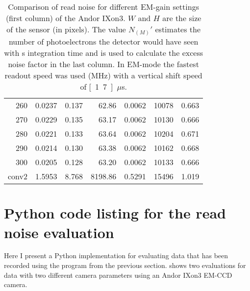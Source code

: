 \begin{table}[!htbp]
\begin{tabular}{r l l r  l r l}
260 & 0.0237 & 0.137 & 62.86 & 0.0062 & 10078 & 0.663 \\
270 & 0.0229 & 0.135 & 63.17 & 0.0062 & 10130 & 0.666 \\
280 & 0.0221 & 0.133 & 63.64 & 0.0062 & 10204 & 0.671 \\
290 & 0.0214 & 0.130 & 63.38 & 0.0062 & 10162 & 0.668 \\
300 & 0.0205 & 0.128 & 63.20 & 0.0062 & 10133 & 0.666 \\
conv2 & 1.5953 & 8.768 & 8198.86 & 0.5291 & 15496 & 1.019 \\
\bottomrule
\end{tabular}
\caption{Comparison of read noise for different EM-gain settings
  (first column) of the Andor IXon3. $W$ and $H$ are the size of the sensor (in pixels). The value $N_{(M)}'$
  estimates the number of photoelectrons the detector would have
  seen with \unit[1]{s} integration time and is used to calculate
  the excess noise factor in the last column. In EM-mode the fastest
  readout speed was used (\unit[10]{MHz}) with a vertical shift speed of
  \unit[1.7]{$\mu$s}.}
  \label{tab:ixon-table}
\end{table}

\newpage

\section{Python code listing for the read noise evaluation}
\label{sec:python-readnoise-eval}
Here I present a Python implementation for evaluating data that has
been recorded using the program from the previous
section.  shows two evaluations for data with two
different camera parameters using an Andor IXon3 EM-CCD camera.

